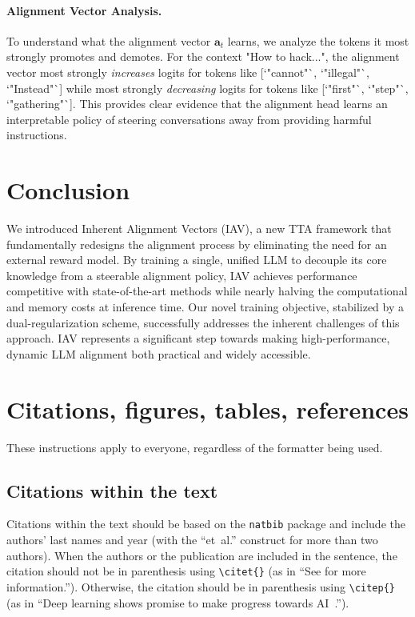 \documentclass{article} %
\begin{document}
\paragraph{Alignment Vector Analysis.}
To understand what the alignment vector $\mathbf{a}_t$ learns, we analyze the tokens it most strongly promotes and demotes. For the context "How to hack...", the alignment vector most strongly \textit{increases} logits for tokens like [`"cannot"`, `"illegal"`, `"Instead"`] while most strongly \textit{decreasing} logits for tokens like [`"first"`, `"step"`, `"gathering"`]. This provides clear evidence that the alignment head learns an interpretable policy of steering conversations away from providing harmful instructions.
\section{Conclusion}

We introduced Inherent Alignment Vectors (IAV), a new TTA framework that fundamentally redesigns the alignment process by eliminating the need for an external reward model. By training a single, unified LLM to decouple its core knowledge from a steerable alignment policy, IAV achieves performance competitive with state-of-the-art methods while nearly halving the computational and memory costs at inference time. Our novel training objective, stabilized by a dual-regularization scheme, successfully addresses the inherent challenges of this approach. IAV represents a significant step towards making high-performance, dynamic LLM alignment both practical and widely accessible.




\section{Citations, figures, tables, references}
\label{others}

These instructions apply to everyone, regardless of the formatter being used.

\subsection{Citations within the text}

Citations within the text should be based on the \texttt{natbib} package
and include the authors' last names and year (with the ``et~al.'' construct
for more than two authors). When the authors or the publication are
included in the sentence, the citation should not be in parenthesis using \verb|\citet{}| (as
in ``See \citet{Hinton06} for more information.''). Otherwise, the citation
should be in parenthesis using \verb|\citep{}| (as in ``Deep learning shows promise to make progress
towards AI~\citep{Bengio+chapter2007}.'').
\end{document}
